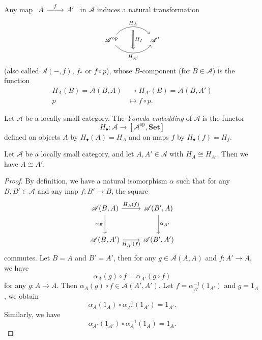 Any map $
\begin{tikzcd}
  A\arrow[r,"f"] &A'
\end{tikzcd}$ in $\mathscr{A}$ induces a natural transformation
\[
  \begin{tikzcd}[column sep=large]
    \mathscr{A}^{\mathrm{op}} \arrow[r, bend left=50, "H_A",""{name=U,below}]\arrow[r,bend right=50,"H_{A'}"',""{name=D}] & \mathscr{A}' \arrow[Rightarrow,"H_f", from=U,to=D]  
\end{tikzcd}
  \](also called $\mathscr{A}(-,f)$, $f_{*}$ or $f\circ p$), whose $B$-component (for $B\in \mathscr{A}$) is the function 
  \begin{align*}
    H_A(B)=\mathscr{A}(B,A)&\to H_{A'}(B)=\mathscr{A}(B,A')\\
    p&\mapsto f\circ p
  .\end{align*}

\begin{definition}
  Let $\mathscr{A}$ be a locally small category. The \textit{Yoneda embedding} of $\mathscr{A}$ is the functor
  \[
  H_{\bullet}:\mathscr{A}\to \left[ \mathscr{A}^{\mathrm{op}},\mathbf{Set} \right] 
\] defined on objects $A$ by $H_{\bullet}(A)=H_{A}$ and on maps $f$ by $H_{\bullet}(f)=H_{f}$.
\end{definition}

\begin{proposition}
  Let $\mathscr{A}$ be a locally small category, and let $A,A'\in \mathscr{A}$ with $H_A\cong H_{A'}$. Then we have $A\cong A'$.
\end{proposition}
\begin{proof}
  By definition, we have a natural isomorphism $\alpha$  such that for any $B,B' \in \mathscr{A}$ and any map $f:B'\to B$, the square
  \[
    \begin{tikzcd}[row sep=large]
    \mathscr{A}(B,A)\arrow[r,"H_A(f)"] \arrow[d,"\alpha_{B}"'] & \mathscr{A}(B',A)\arrow[d,"\alpha_{B'}"] \\
    \mathscr{A}(B,A')\arrow[r,"H_{A'}(f)"'] & \mathscr{A}(B',A')
  \end{tikzcd}
  \] 
  commutes. Let $B=A$ and $B'=A'$, then for any $g\in \mathscr{A}(A,A)$ and $f:A'\to A$, we have
  \[
    \alpha_A(g)\circ f=\alpha_{A'}\left( g\circ f \right) 
  \] for any $g:A\to A$. Then $\alpha_A(g)\circ f \in \mathscr{A}(A',A')$. Let $f=\alpha ^{-1}_{A'}(1_{A'})$ and $g=1_{A}$, we obtain
  \[
    \alpha_A(1_A)\circ \alpha ^{-1}_{A'}(1_{A'})=1_{A'}.
  \]
  Similarly, we have
  \[
    \alpha_{A'}(1_{A'})\circ \alpha_A^{-1}(1_A)=1_{A}.
  \] 
\end{proof}


